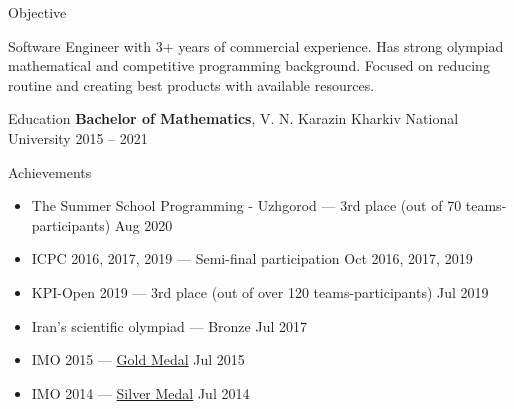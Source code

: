 \documentclass{resume} %
\begin{document}

\begin{rSection}{Objective}

  Software Engineer with 3+ years of commercial experience.
  Has strong olympiad mathematical and competitive programming background.
  Focused on reducing routine and creating best products with available resources.

\end{rSection}


\begin{rSection}{Education}
  {\bf Bachelor of Mathematics}, V. N. Karazin Kharkiv National University \hfill {2015 -- 2021}
\end{rSection}

\begin{rSection}{Achievements}
  \begin{itemize}
    \itemsep -3pt
    \item The Summer School Programming - Uzhgorod --- 3rd place (out of 70 teams-participants)
    \hfill Aug 2020
    \item ICPC 2016, 2017, 2019 --- Semi-final participation
    \hfill Oct 2016, 2017, 2019
    \item KPI-Open 2019 --- 3rd place (out of over 120 teams-participants)
    \hfill Jul 2019
    \item Iran's scientific olympiad --- Bronze
    \hfill Jul 2017
    \item IMO 2015 --- \href{https://www.imo-official.org/participant_r.aspx?id=25121}{Gold Medal}
    \hfill Jul 2015
    \item IMO 2014 --- \href{https://www.imo-official.org/participant_r.aspx?id=25121}{Silver Medal}
    \hfill Jul 2014
  \end{itemize}
\end{rSection}
\end{document}

